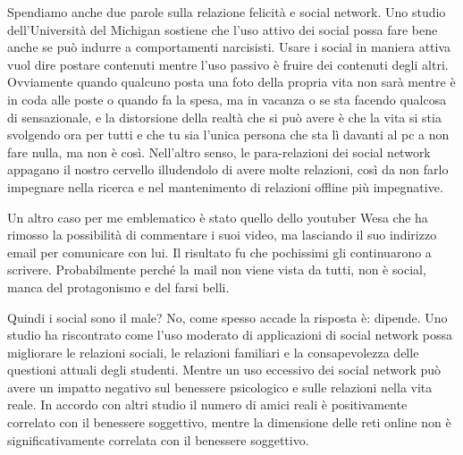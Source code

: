 \documentclass[12pt]{book} %
\begin{document}
\begin{mdframed}[linewidth=1pt]
Spendiamo anche due parole sulla relazione felicità e social network. Uno studio dell'Università del Michigan sostiene
che l'uso attivo dei social possa fare bene anche se può indurre a comportamenti narcisisti. Usare
i social in maniera attiva vuol dire postare contenuti mentre l'uso passivo è fruire dei contenuti
degli altri. Ovviamente quando qualcuno posta una foto della propria vita non sarà mentre è in coda alle poste o quando
fa la spesa, ma in vacanza o se sta facendo qualcosa di sensazionale, e la distorsione della realtà che si può avere è
che la vita si stia svolgendo ora per tutti e che tu sia l'unica persona che sta lì davanti al pc
a non fare nulla, ma non è così. Nell'altro senso, le para-relazioni dei social network appagano il nostro cervello illudendolo di avere molte relazioni, così da non farlo impegnare nella ricerca e nel mantenimento di relazioni offline più impegnative.

Un altro caso per me emblematico è stato quello dello youtuber Wesa che ha rimosso la possibilità di commentare i suoi
video, ma lasciando il suo indirizzo email per comunicare con lui. Il risultato fu che pochissimi gli continuarono a
scrivere. Probabilmente perché la mail non viene vista da tutti, non è social, manca del protagonismo e del farsi
belli.

Quindi i social sono il male? No, come spesso accade la risposta è: dipende. Uno studio ha riscontrato come l'uso moderato di applicazioni di social network possa migliorare le relazioni sociali, le relazioni familiari e la consapevolezza delle questioni attuali degli studenti. Mentre un uso eccessivo dei social network può avere un impatto negativo sul benessere psicologico e sulle relazioni nella vita reale. In accordo con altri studio il numero di amici reali è positivamente correlato con il benessere soggettivo, mentre la dimensione delle reti online non è significativamente correlata con il benessere soggettivo.


\end{mdframed}
\end{document}
